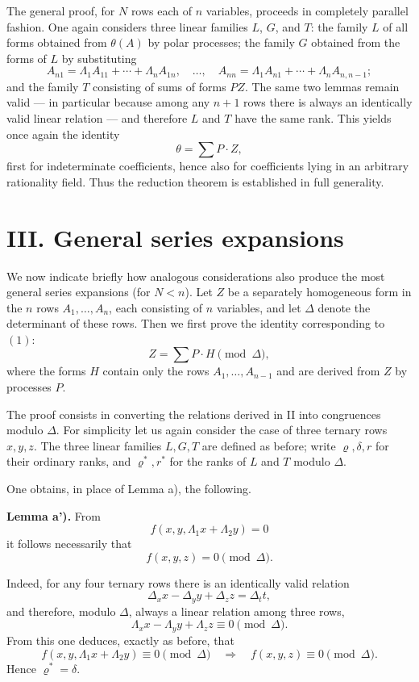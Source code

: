 \documentclass[11pt]{article}
\begin{document}
\medskip
The general proof, for \(N\) rows each of \(n\) variables, proceeds in completely parallel fashion. One again considers three linear families \(L\), \(G\), and \(T\): the family \(L\) of all forms obtained from \(\theta(A)\) by polar processes; the family \(G\) obtained from the forms of \(L\) by substituting
\[
A_{n1}=\Lambda_1A_{11}+\cdots+\Lambda_nA_{1n},\quad \dots,\quad
A_{nn}=\Lambda_1A_{n1}+\cdots+\Lambda_nA_{n,n-1};
\]
and the family \(T\) consisting of sums of forms \(PZ\). The same two lemmas remain valid --- in particular because among any \(n+1\) rows there is always an identically valid linear relation --- and therefore \(L\) and \(T\) have the same rank. This yields once again the identity
\[
\theta=\sum P\cdot Z,
\]
first for indeterminate coefficients, hence also for coefficients lying in an arbitrary rationality field. Thus the reduction theorem is established in full generality.

\section*{III. General series expansions}

We now indicate briefly how analogous considerations also produce the most general series expansions (for \(N<n\)). Let \(Z\) be a separately homogeneous form in the \(n\) rows \(A_1,\dots,A_n\), each consisting of \(n\) variables, and let \(\Delta\) denote the determinant of these rows. Then we first prove the identity corresponding to \((1)\):
\[
Z=\sum P\cdot H \pmod{\Delta},
\tag{2}
\]
where the forms \(H\) contain only the rows \(A_1,\dots,A_{n-1}\) and are derived from \(Z\) by processes \(P\).

The proof consists in converting the relations derived in II into congruences modulo \(\Delta\). For simplicity let us again consider the case of three ternary rows \(x,y,z\). The three linear families \(L,G,T\) are defined as before; write \(\varrho,\delta,r\) for their ordinary ranks, and \(\varrho^*,r^*\) for the ranks of \(L\) and \(T\) modulo \(\Delta\).

One obtains, in place of Lemma a), the following.

\medskip
\noindent\textbf{Lemma a').}
From
\[
f(x,y,\Lambda_1x+\Lambda_2y)=0
\]
it follows necessarily that
\[
f(x,y,z)=0\pmod{\Delta}.
\]

Indeed, for any four ternary rows there is an identically valid relation
\[
\Delta_x x-\Delta_y y+\Delta_z z=\Delta_t t,
\]
and therefore, modulo \(\Delta\), always a linear relation among three rows,
\[
\Lambda_x x-\Lambda_y y+\Lambda_z z\equiv 0 \pmod{\Delta}.
\]
From this one deduces, exactly as before, that
\[
f(x,y,\Lambda_1x+\Lambda_2y)\equiv 0 \pmod{\Delta}
\quad\Rightarrow\quad
f(x,y,z)\equiv 0 \pmod{\Delta}.
\]
Hence \(\varrho^*=\delta\).
\end{document}
